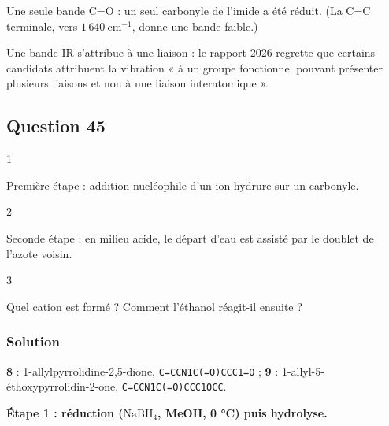 \documentclass[11pt,a4paper]{article}
\begin{document}
Une seule bande C=O : un seul carbonyle de l'imide a été réduit. (La C=C terminale, vers \(1\,640\ \mathrm{cm^{-1}}\), donne une bande faible.)

\begin{jury}

Une bande IR s'attribue à une liaison : le rapport 2026 regrette que certains candidats attribuent la vibration « à un groupe fonctionnel pouvant présenter plusieurs liaisons et non à une liaison interatomique ».

\end{jury}

\hypertarget{question-45}{%
\subsection{Question 45}\label{question-45}}

\begin{indication}{1}

Première étape : addition nucléophile d'un ion hydrure sur un carbonyle.

\end{indication}

\begin{indication}{2}

Seconde étape : en milieu acide, le départ d'eau est assisté par le doublet de l'azote voisin.

\end{indication}

\begin{indication}{3}

Quel cation est formé ? Comment l'éthanol réagit-il ensuite ?

\end{indication}

\hypertarget{solution-44}{%
\subsubsection{Solution}\label{solution-44}}

\textbf{8} : 1-\allowbreak{}allylpyrrolidine-\allowbreak{}2,5-\allowbreak{}dione, \texttt{C=\allowbreak{}CCN1C(\allowbreak{}=\allowbreak{}O)\allowbreak{}CCC1=\allowbreak{}O} ; \textbf{9} : 1-\allowbreak{}allyl-\allowbreak{}5-\allowbreak{}éthoxypyrrolidin-\allowbreak{}2-\allowbreak{}one, \texttt{C=\allowbreak{}CCN1C(\allowbreak{}=\allowbreak{}O)\allowbreak{}CCC1OCC}.

\textbf{Étape 1 : réduction (\(\mathrm{NaBH_4}\), MeOH, 0 °C) puis hydrolyse.}
\end{document}
